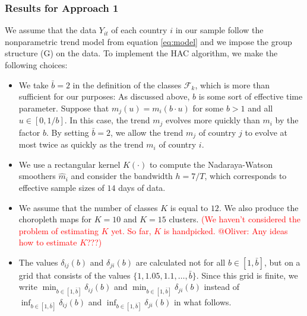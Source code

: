 \documentclass[a4paper,12pt]{article}
\numberwithin{equation}{section}
\begin{document}
\subsubsection{Results for Approach 1}\label{subsubsec:method1}


We assume that the data $Y_{it}$ of each country $i$ in our sample follow the nonparametric trend model from equation \eqref{eq:model} and we impose the group structure (G) on the data. 
To implement the HAC algorithm, we make the following choices:
\begin{itemize}[leftmargin=0.6cm]
\item We take $\bar{b} = 2$ in the definition of the classes $\mathcal{F}_k$, which is more than sufficient for our purposes: As discussed above, $b$ is some sort of effective time parameter. Suppose that $m_j(u) = m_i(b \cdot u)$ for some $b > 1$ and all $u \in [0,1/b]$. In this case, the trend $m_j$ evolves more quickly than $m_i$ by the factor $b$. By setting $\bar{b} = 2$, we allow the trend $m_j$ of country $j$ to evolve at most twice as quickly as the trend $m_i$ of country $i$.  
\item We use a rectangular kernel $K(\cdot)$ to compute the Nadaraya-Watson smoothers $\hat{m}_{i}$ and consider the bandwidth $h = 7/T$, which corresponds to effective sample sizes of $14$ days of data. 
\item We assume that the number of classes $K$ is equal to $12$. We also produce the choropleth maps for $K=10$ and $K = 15$ clusters. \textcolor{red}{(We haven't considered the problem of estimating $K$ yet. So far, $K$ is handpicked. @Oliver: Any ideas how to estimate $K$???)}
\item The values $\delta_{ij}(b)$ and $\delta_{ji}(b)$ are calculated not for all $b\in [1, \bar{b}]$, but on a grid that consists of the values $\{1, 1.05, 1.1, \ldots, \bar{b}\}$. Since this grid is finite, we write $\min_{b \in [1, \bar{b}]} \delta_{ij}(b)$ and $\min_{b \in [1, \bar{b}]} \delta_{ji}(b)$ instead of $\inf_{b \in [1, \bar{b}]} \delta_{ij}(b)$ and $\inf_{b \in [1, \bar{b}]} \delta_{ji}(b)$ in what follows.
\end{itemize}
\end{document}
